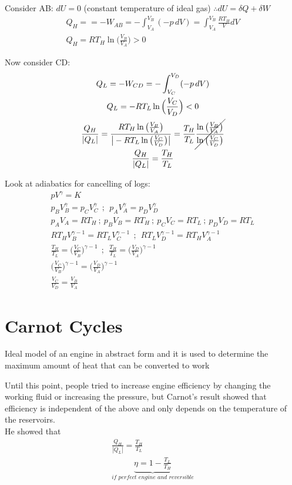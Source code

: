 \documentclass[a4paper, 11pt, normalem]{report}
\begin{document}
Consider AB: $dU = 0$ (constant temperature of ideal gas) $\therefore dU = \delta Q + \delta W$
\begin{gather*}
    Q_H = = -W_{AB} = - \int_{V_{A}}^{V_B} (-p\,dV) = \int_{V_A}^{V_B} \frac{RT_{H}}{V}dV \\
    Q_H = RT_{H}\ln\Big(\frac{V_B}{V_A}\Big) > 0
\end{gather*}

Now consider CD:
\begin{gather*}
    Q_L = -W_{CD} = - \int_{V_C}^{V_D} (-p\,dV) \\
    Q_L = -RT_L \ln\Big(\frac{V_C}{V_D}\Big) < 0 \\
    \frac{Q_H}{|Q_L|} = \frac{RT_{H}\ln\big(\tfrac{V_B}{V_A}\big)}{\big|-RT_L \ln\big(\tfrac{V_C}{V_D}\big)\big|} = \frac{T_H}{T_L} \cancel{\frac{\ln\big(\tfrac{V_B}{V_A}\big)}{\ln\big(\tfrac{V_C}{V_D}\big)}}\\
    \frac{Q_H}{|Q_L|} = \frac{T_H}{T_L}
\end{gather*}

Look at adiabatics for cancelling of logs:
\begin{gather*}
    pV^\gamma = K \\
    p_{B}V_{B}^{\gamma} = p_{C}V_{C}^{\gamma} ~~;~~ p_{A}V_{A}^{\gamma} = p_{D}V_{D}^{\gamma} \\
    p_A V_A = RT_H ~;~ p_B V_B = RT_H ~;~ p_C V_C = RT_L ~;~ p_D V_D = RT_L \\
    RT_H V_{B}^{\gamma - 1} = RT_L V_{C}^{\gamma - 1} ~~;~~ RT_{L}V_{D}^{\gamma - 1} = RT_{H}V_{A}^{\gamma - 1} \\
    \frac{T_H}{T_L} = \Big(\frac{V_C}{V_B}\Big)^{\gamma - 1} ~~;~~ \frac{T_H}{T_L} = \Big(\frac{V_D}{V_A}\Big)^{\gamma - 1} \\
    \Big(\frac{V_C}{V_B}\Big)^{\gamma - 1} = \Big(\frac{V_D}{V_A}\Big)^{\gamma - 1} \\
    \frac{V_C}{V_D} = \frac{V_B}{V_A}
\end{gather*}

\section{Carnot Cycles}
Ideal model of an engine in abstract form and it is used to determine the maximum amount of heat that can be converted to work

Until this point, people tried to increase engine efficiency by changing the working fluid or increasing the pressure, but Carnot's result showed that efficiency is independent of the above and only depends on the temperature of the reservoirs. \\
He showed that
\begin{gather*}
    \frac{Q_H}{|Q_L|} = \frac{T_H}{T_L} \\
    \underbrace{\eta = 1 - \frac{T_L}{T_H}}_{\textit{if perfect engine and reversible}}
\end{gather*}
\end{document}
